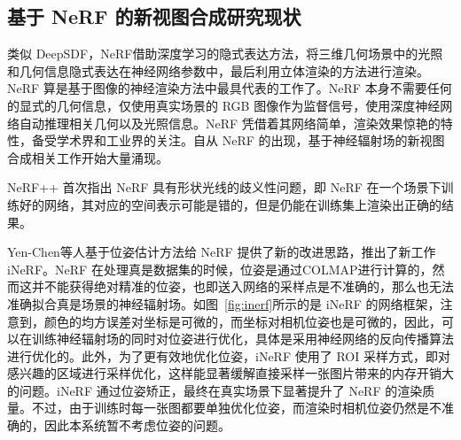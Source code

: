 
\subsection{基于 NeRF 的新视图合成研究现状}
类似 DeepSDF\cite{park2019deepsdf}，NeRF\cite{mildenhall2020nerf}借助深度学习的隐式表达方法，将三维几何场景中的光照和几何信息隐式表达在神经网络参数中，最后利用立体渲染的方法进行渲染。NeRF 算是基于图像的神经渲染方法中最具代表的工作了。NeRF 本身不需要任何的显式的几何信息，仅使用真实场景的 RGB 图像作为监督信号，使用深度神经网络自动推理相关几何以及光照信息。NeRF 凭借着其网络简单，渲染效果惊艳的特性，备受学术界和工业界的关注。自从 NeRF 的出现，基于神经辐射场的新视图合成相关工作开始大量涌现。

NeRF++\cite{zhang2020nerf++} 首次指出 NeRF 具有形状光线的歧义性问题，即 NeRF 在一个场景下训练好的网络，其对应的空间表示可能是错的，但是仍能在训练集上渲染出正确的结果。

%

Yen-Chen等人\cite{yen2020inerf}基于位姿估计方法给 NeRF 提供了新的改进思路，推出了新工作 iNeRF。NeRF 在处理真是数据集的时候，位姿是通过COLMAP\cite{schonberger2016structure}进行计算的，然而这并不能获得绝对精准的位姿，也即送入网络的采样点是不准确的，那么也无法准确拟合真是场景的神经辐射场。如图~\ref{fig:inerf}所示的是 iNeRF 的网络框架，注意到，颜色的均方误差对坐标是可微的，而坐标对相机位姿也是可微的，因此，可以在训练神经辐射场的同时对位姿进行优化，具体是采用神经网络的反向传播算法进行优化的。此外，为了更有效地优化位姿，iNeRF 使用了 ROI 采样方式，即对感兴趣的区域进行采样优化，这样能显著缓解直接采样一张图片带来的内存开销大的问题。iNeRF 通过位姿矫正，最终在真实场景下显著提升了 NeRF 的渲染质量。不过，由于训练时每一张图都要单独优化位姿，而渲染时相机位姿仍然是不准确的，因此本系统暂不考虑位姿的问题。

